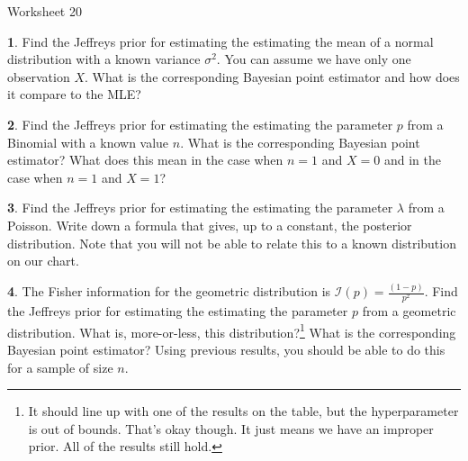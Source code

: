 \documentclass{tufte-handout}
\begin{document}
\justify

{\LARGE Worksheet 20}

\vspace*{18pt}


\textbf{1}. Find the Jeffreys prior for estimating the estimating the mean of a normal
distribution with a known variance $\sigma^2$. You can assume we have only one
observation $X$. What is the corresponding
Bayesian point estimator and how does it compare to the MLE?

\textbf{2}. Find the Jeffreys prior for estimating the estimating the parameter $p$ from a
Binomial with a known value $n$. What is the corresponding Bayesian point estimator?
What does this mean in the case when $n=1$ and $X=0$ and in the case when $n=1$ and $X=1$?

\textbf{3}. Find the Jeffreys prior for estimating the estimating the parameter $\lambda$ from
a Poisson. Write down a formula that gives, up to a constant,
the posterior distribution. Note that you will not be able to relate this to a 
known distribution on our chart.

\textbf{4}. The Fisher information for the geometric distribution is $\mathcal{I}(p) = \frac{(1-p)}{p^2}$.
Find the Jeffreys prior for estimating the estimating the parameter $p$ from
a geometric distribution. What is, more-or-less, this distribution?\footnote{
  It should line up with one of the results on the table, but the hyperparameter
  is out of bounds. That's okay though. It just means we have an improper prior.
  All of the results still hold. 
} What is the corresponding Bayesian point estimator? Using previous results,
you should be able to do this for a sample of size $n$.
\end{document}
